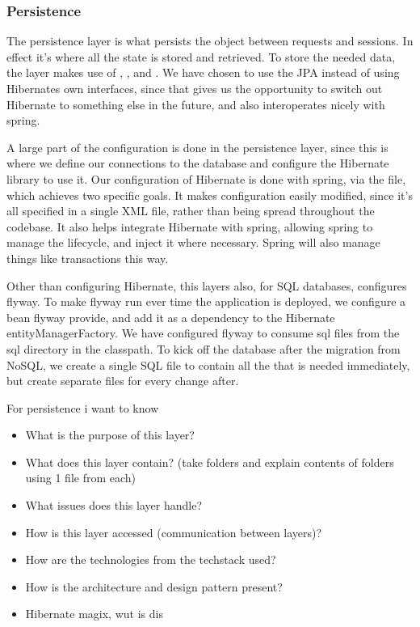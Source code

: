 \subsubsection{Persistence}
The persistence layer is what persists the object between requests and
sessions. In effect it's where all the state is stored and retrieved. To store
the needed data, the layer makes use of ,
, and . We have chosen to use the JPA
instead of using Hibernates own interfaces, since that gives us the opportunity
to switch out Hibernate to something else in the future, and also interoperates
nicely with spring.

A large part of the configuration is done in the persistence layer, since this
is where we define our connections to the database and configure the Hibernate
library to use it. Our configuration of Hibernate is done with spring, via the
 file, which achieves two specific goals. It makes
configuration easily modified, since it's all specified in a single XML file,
rather than being spread throughout the codebase. It also helps integrate
Hibernate with spring, allowing spring to manage the 
lifecycle, and inject it where necessary. Spring will also manage things like
transactions this way.

Other than configuring Hibernate, this layers also, for SQL databases,
configures flyway. To make flyway run ever time the application is deployed, we
configure a bean flyway provide, and add it as a dependency to the Hibernate
entityManagerFactory. We have configured flyway to consume sql files from the
sql directory in the classpath. To kick off the database after the migration
from NoSQL, we create a single SQL file to contain all the  that is
needed immediately, but create separate files for every change after.

For persistence i want to know
\begin{itemize}
    \item What is the purpose of this layer?
    \item What does this layer contain? (take folders and explain contents of folders using 1 file from each)
    \item What issues does this layer handle?
    \item How is this layer accessed (communication between layers)?
    \item How are the technologies from the techstack used?
    \item How is the architecture and design pattern present?
    \item Hibernate magix, wut is dis
\end{itemize}
